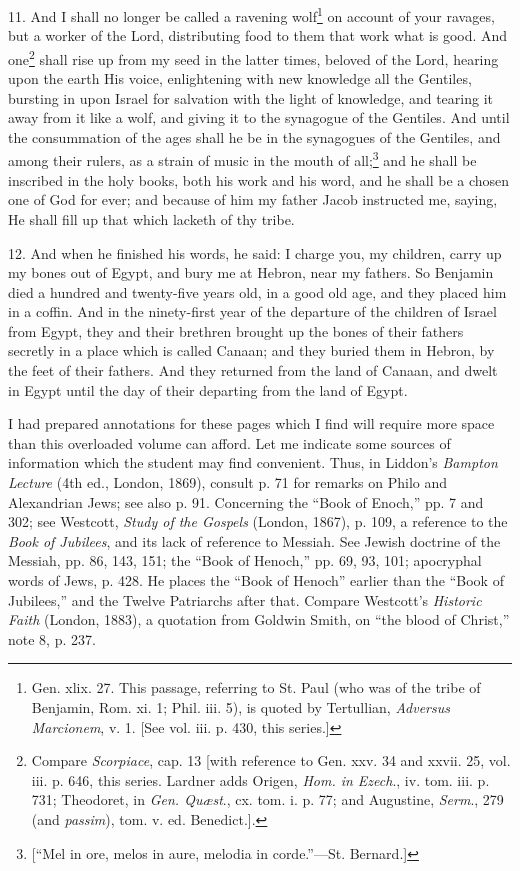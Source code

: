 11. And I shall no longer be called a ravening wolf\footnote{Gen. xlix. 27. This passage, referring to St. Paul (who was of the tribe of Benjamin, Rom. xi. 1; Phil. iii. 5), is quoted by Tertullian, \emph{Adversus Marcionem}, v. 1. [See vol. iii. p. 430, this series.]} on account of your ravages, but a worker of the Lord, distributing food to them that work what is good. And one\footnote{Compare \emph{Scorpiace}, cap. 13 [with reference to Gen. xxv. 34 and xxvii. 25, vol. iii. p. 646, this series. Lardner adds Origen, \emph{Hom. in Ezech}., iv. tom. iii. p. 731; Theodoret, in \emph{Gen. Quæst}., cx. tom. i. p. 77; and Augustine, \emph{Serm}., 279 (and \emph{passim}), tom. v. ed. Benedict.].} shall rise up from my seed in the latter times, beloved of the Lord, hearing upon the earth His voice, enlightening with new knowledge all the Gentiles, bursting in upon Israel for salvation with the light of knowledge, and tearing it away from it like a wolf, and giving it to the synagogue of the Gentiles. And until the consummation of the ages shall he be in the synagogues of the Gentiles, and among their rulers, as a strain of music in the mouth of all;\footnote{[“Mel in ore, melos in aure, melodia in corde.”—St. Bernard.]} and he shall be inscribed in the holy books, both his work and his word, and he shall be a chosen one of God for ever; and because of him my father Jacob instructed me, saying, He shall fill up that which lacketh of thy tribe.

12. And when he finished his words, he said: I charge you, my children, carry up my bones out of Egypt, and bury me at Hebron, near my fathers. So Benjamin died a hundred and twenty-five years old, in a good old age, and they placed him in a coffin. And in the ninety-first year of the departure of the children of Israel from Egypt, they and their brethren brought up the bones of their fathers secretly in a place which is called Canaan; and they buried them in Hebron, by the feet of their fathers. And they returned from the land of Canaan, and dwelt in Egypt until the day of their departing from the land of Egypt.


I had prepared annotations for these pages which I find will require more space than this overloaded volume can afford. Let me indicate some sources of information which the student may find convenient. Thus, in Liddon’s \emph{Bampton Lecture} (4th ed., London, 1869), consult p. 71 for remarks on Philo and Alexandrian Jews; see also p. 91. Concerning the “Book of Enoch,” pp. 7 and 302; see Westcott, \emph{Study of the Gospels} (London, 1867), p. 109, a reference to the \emph{Book of Jubilees}, and its lack of reference to Messiah. See Jewish doctrine of the Messiah, pp. 86, 143, 151; the “Book of Henoch,” pp. 69, 93, 101; apocryphal words of Jews, p. 428. He places the “Book of Henoch” earlier than the “Book of Jubilees,” and the Twelve Patriarchs after that. Compare Westcott’s \emph{Historic Faith} (London, 1883), a quotation from Goldwin Smith, on “the blood of Christ,” note 8, p. 237.

